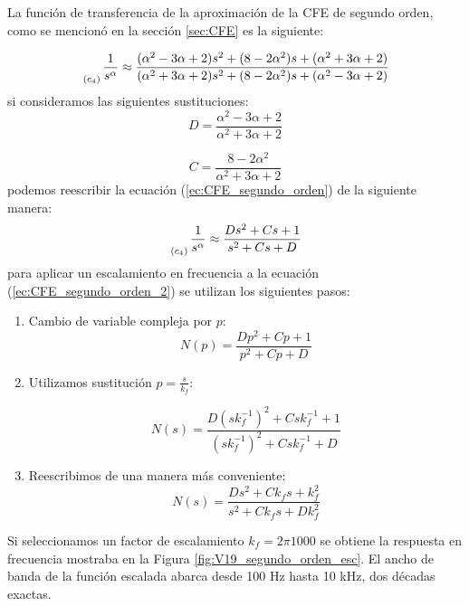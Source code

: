 	La función de transferencia de la aproximación de la CFE de segundo orden, como se mencionó en la sección \ref{sec:CFE} es la siguiente:
	
	\begin{equation}
		\genfrac{}{}{0pt}{0}{}{_{(c_{4})}} \frac{1}{s^{\alpha}} \approx \frac{(\alpha^{2} - 3\alpha + 2) s^{2} + (8 - 2 \alpha^{2})s + (\alpha^{2} + 3\alpha + 2) }{(\alpha^{2} + 3\alpha + 2) s^{2} + (8 - 2 \alpha^{2})s + (\alpha^{2} - 3\alpha + 2)}
		\label{ec:CFE_segundo_orden}
	\end{equation}
	si consideramos las siguientes sustituciones:
	\begin{equation}
		D = \frac{\alpha^{2} - 3 \alpha + 2}{\alpha^{2} + 3\alpha + 2}
	\end{equation}
	
	\begin{equation}
		C = \frac{8 - 2 \alpha^{2}}{\alpha^{2} +  3 \alpha + 2}
	\end{equation}
	podemos reescribir la ecuación (\ref{ec:CFE_segundo_orden}) de la siguiente manera:
	\begin{equation}
		\genfrac{}{}{0pt}{0}{}{_{(c_{4})}} \frac{1}{s^{\alpha}} \approx  \frac{D s^{2} + Cs + 1}{s^{2} + Cs + D}
		\label{ec:CFE_segundo_orden_2}
	\end{equation}
	para aplicar un escalamiento en frecuencia a la ecuación (\ref{ec:CFE_segundo_orden_2}) se utilizan los siguientes pasos:
	
	\begin{enumerate}
		\item Cambio de variable compleja por $p$:
		\begin{equation}
			N(p) = \frac{D p^{2} + Cp + 1}{p^{2} + Cp + D}
		\end{equation}
		
		\item Utilizamos sustitución $p = \frac{s}{k_{f}}$:
		
		\begin{equation}
			N(s) = \frac{D (sk_{f}^{-1})^{2} + Csk_{f}^{-1} + 1}{(sk_{f}^{-1})^{2} + Csk_{f}^{-1} + D}
		\end{equation}
		
		\item Reescribimos de una manera más conveniente:
		\begin{equation}
			N(s) = \frac{D s^{2} + C k_{f}s + k_{f}^{2}}{s^{2} + C k_{f}s + Dk_{f}^{2}}
			\label{ec:CFE_segundo_final}
		\end{equation}
	\end{enumerate}
	Si seleccionamos un factor de escalamiento $k_{f} = 2 \pi 1000$ se obtiene la respuesta en frecuencia mostraba en la Figura \ref{fig:V19_segundo_orden_esc}. El ancho de banda de la función escalada abarca desde 100 Hz hasta 10 kHz, dos décadas exactas.
	
